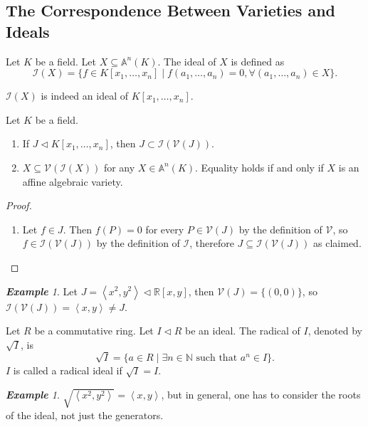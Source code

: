 \documentclass[titlepage]{article}
\theoremstyle{remark}
\newtheorem{example}[definition]{\textbf{Example}}
\newcommand{\idealof}{\vartriangleleft}
\begin{document}
\subsection{The Correspondence Between Varieties and Ideals}
  \begin{definition}
    Let $K$ be a field. Let $X\subseteq \mathbb{A}^n(K)$. The ideal of $X$ is defined as 
    \[
      \mathcal{I}(X)=\{f\in K[x_1,\dots,x_n]\mid f(a_1,\dots,a_n)=0,\forall (a_1,\dots,a_n)\in X\}.
    \]
  \end{definition}
  $\mathcal{I}(X)$ is indeed an ideal of $K[x_1,\dots,x_n]$.
  \begin{proposition}
    Let $K$ be a field.
    \begin{enumerate}
      \item If $J\idealof K[x_1,\dots,x_n]$, then $J\subset \mathcal{I}(\mathcal{V}(J))$.
      \item $X\subseteq \mathcal{V}(\mathcal{I}(X))$ for any $X\in \mathbb{A}^n(K)$. Equality holds if and only if $X$ is an affine algebraic variety.
    \end{enumerate}
  \end{proposition}
  \begin{proof}$ $
    \begin{enumerate}
      \item Let $f\in J$. Then $f(P)=0$ for every $P\in \mathcal{V}(J)$ by the definition of $\mathcal{V}$, so $f\in \mathcal{I}(\mathcal{V}(J))$ by the definition of $\mathcal{I}$, therefore $J\subseteq \mathcal{I}(\mathcal{V}(J))$ as claimed. \qedhere
    \end{enumerate}
  \end{proof}
  \begin{example}
    Let $J=\left\langle x^2,y^2\right\rangle\idealof \mathbb{R}[x,y]$, then $\mathcal{V}(J)=\{(0,0)\}$, so $\mathcal{I}(\mathcal{V}(J))=\left\langle x,y\right\rangle\ne J$.
  \end{example}
  \begin{definition}
    Let $R$ be a commutative ring. Let $I\idealof R$ be an ideal. The radical of $I$, denoted by $\sqrt{I}$, is 
    \[
      \sqrt{I}=\{a\in R\mid\exists n\in \mathbb{N} \text{ such that }a^n\in I\}.
    \]
    $I$ is called a radical ideal if $\sqrt{I}=I$.
  \end{definition}
  \begin{example}
    $\sqrt{\left\langle x^2,y^2\right\rangle}=\left\langle x,y\right\rangle$, but in general, one has to consider the roots of the ideal, not just the generators.
  \end{example}
\end{document}
